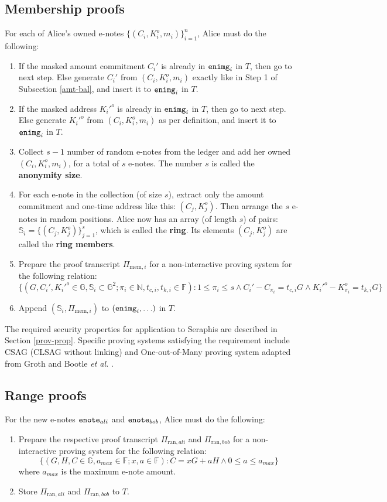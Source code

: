 \documentclass{article}
\begin{document}
\subsection{Membership proofs}\label{mem}
For each of Alice's owned e-notes $\{(C_i,K_i^o,m_i)\}_{i=1}^n$, Alice must do the following:
\begin{enumerate}
    \item If the masked amount commitment $C_i'$ is already in ${\tt enimg}_i$ in $T$, then go to next step. Else generate $C_i'$ from $(C_i, K_i^o, m_i)$ exactly like in Step 1 of Subsection \ref{amt-bal}, and insert it to ${\tt enimg}_i$ in $T$.
    \item If the masked address $K_i'^o$ is already in ${\tt enimg}_i$ in $T$, then go to next step. Else generate $K_i'^o$ from $(C_i, K_i^o, m_i)$ as per definition, and insert it to ${\tt enimg}_i$ in $T$.
    \item Collect $s-1$ number of random e-notes from the ledger and add her owned $(C_i,K_i^o,m_i)$, for a total of $s$ e-notes. The number $s$ is called the \textbf{anonymity size}.
    \item For each e-note in the collection (of size $s$), extract only the amount commitment and one-time address like this: $(C_j, K_j^o)$. Then arrange the $s$ e-notes in random positions. Alice now has an array (of length $s$) of pairs: $\mathbb{S}_i = \{(C_j, K_j^o)\}_{j=1}^s$, which is called the \textbf{ring}. Its elements $(C_j, K_j^o)$ are called the \textbf{ring members}. 
    \item Prepare the proof transcript $\Pi_{\text{mem}, i}$ for a non-interactive proving system for the following relation:
$$\{(G, C_i', K_i'^o \in\mathbb{G}, \mathbb{S}_i\subset\mathbb{G}^2; \pi_i\in\mathbb{N}, t_{c,i}, t_{k,i}\in\mathbb{F}): 1\le\pi_i\le s \wedge C_i' - C_{\pi_i} = t_{c,i} G \wedge K_i'^o - K_{\pi_i}^o = t_{k,i} G \}$$
    \item Append $(\mathbb{S}_i, \Pi_{\text{mem}, i})$ to $({\tt enimg}_i, \ldots)$ in $T$.
\end{enumerate}
The required security properties for application to Seraphis are described in Section \ref{prov-prop}. Specific proving systems satisfying the requirement include CSAG (CLSAG \cite{clsag} without linking) and One-out-of-Many proving system adapted from Groth and Bootle \textit{et al.} \cite{groth, bootle}.

\subsection{Range proofs}\label{range}
For the new e-notes ${\tt enote}_{ali}$ and ${\tt enote}_{bob}$, Alice must do the following:
\begin{enumerate}
    \item Prepare the respective proof transcript $\Pi_{\text{ran}, ali}$ and $\Pi_{\text{ran}, bob}$ for a non-interactive proving system for the following relation:
$$\{(G, H, C \in\mathbb{G}, a_{max}\in\mathbb{F}; x, a\in\mathbb{F}): C = x G + a H \wedge 0\le a \le a_{max}\}$$
	where $a_{max}$ is the maximum e-note amount.
    \item Store $\Pi_{\text{ran}, ali}$ and $\Pi_{\text{ran}, bob}$ to $T$.
\end{enumerate}
\end{document}
